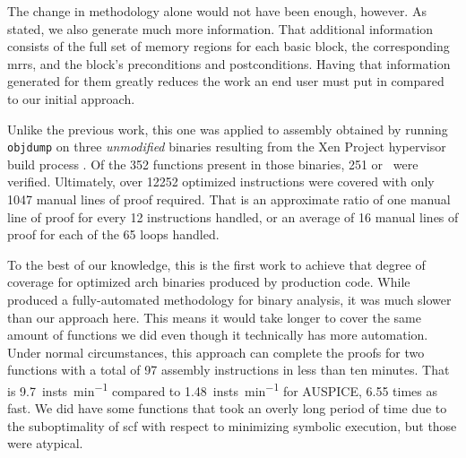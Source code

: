 The change in methodology alone would not have been enough, however.
As stated, we also generate much more information.
That additional information consists of the full set of memory regions for each basic block, the corresponding \acp{mrr}, and the block's preconditions and postconditions.
Having that information generated for them greatly reduces the work an end user must put in compared to our initial approach.

Unlike the previous work, this one was applied to assembly obtained by running \texttt{objdump} on three \emph{unmodified} binaries resulting from the Xen Project hypervisor build process \autocite{chisnall2008definitive}.
Of the \num{352} functions present in those binaries, \num{251} or \xenpercentage\ were verified.
Ultimately, over \num{12252} optimized instructions were covered with only \num{1047} manual lines of proof required.
That is an approximate ratio of one manual line of proof for every \num{12} instructions handled, or an average of \num{16} manual lines of proof for each of the \num{65} loops handled.

To the best of our knowledge, this is the first work to achieve that degree of coverage for optimized \gls{arch} binaries produced by production code.
While \textcite{tan2015auspice} produced a fully-automated methodology for binary analysis, it was much slower than our approach here.
This means it would take longer to cover the same amount of functions we did even though it technically has more automation.
Under normal circumstances, this approach can complete the proofs for two functions with a total of \num{97} assembly instructions in less than ten minutes.
That is \SI{9.7}{insts\per\minute} compared to \SI{1.48}{insts\per\minute} for AUSPICE, \num{6.55} times as fast.
We did have some functions that took an overly long period of time due to the suboptimality of \acl*{scf} with respect to minimizing symbolic execution, but those were atypical.

